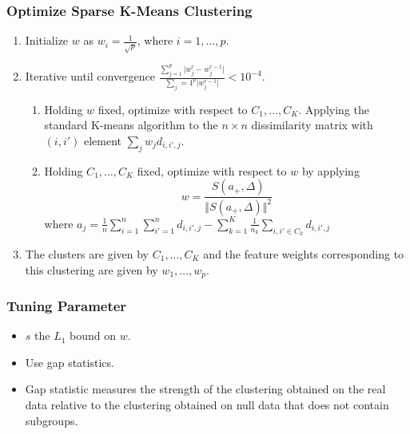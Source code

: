 \documentclass{beamer}
\begin{document}
\begin{frame}
\frametitle{Optimize Sparse K-Means Clustering}
\begin{enumerate}
\item Initialize $w$ as $w_i = \frac{1}{\sqrt{p}}$, where $i = 1, \ldots, p$.
\item Iterative until convergence $\frac{ \sum_{j=1}^p \vert w_j^r - w_j^{r-1} \vert}{\sum_j=1^p \vert w_j^{r-1} \vert} < 10^{-4}$.
    \begin{enumerate}
    \item Holding $w$ fixed, optimize with respect to $C_1, \ldots, C_K$. Applying the standard K-means algorithm to the $n \times n$ dissimilarity matrix with $(i,i')$ element $\sum_j w_j d_{i,i',j}$.
    \item Holding $C_1,\ldots, C_K$ fixed, optimize with respect to $w$ by applying
$$
w = \frac{S(a_+, \Delta)}{\Vert S(a_+,\Delta) \Vert^2}
$$
where
$
a_j = \frac{1}{n} \sum_{i=1}^n \sum_{i'=1}^n d_{i,i',j} - \sum_{k=1}^K \frac{1}{n_k} \sum_{i,i' \in C_k} d_{i,i',j}
$
    \end{enumerate}
\item The clusters are given by $C_1,\ldots, C_K$ and the feature weights corresponding to this clustering are given by $w_1, \ldots, w_p$.
\end{enumerate}
\end{frame}
\begin{frame}
\frametitle{Tuning Parameter}

\begin{itemize}
    \item $s$ the $L_1$ bound on $w$.
    \item Use gap statistics.
    \item Gap statistic measures the strength of the clustering obtained on the real data relative to the clustering obtained on null data that does not contain subgroups.
\end{itemize}

\end{frame}
\end{document}
